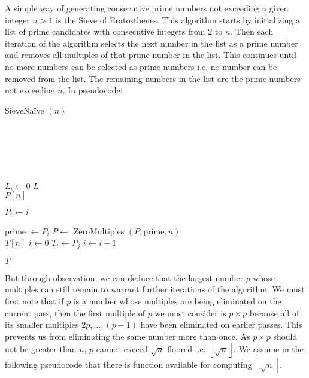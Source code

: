 \documentclass[12pt letter]{report}
\begin{document}
A simple way of generating consecutive prime numbers not exceeding a given integer $n > 1$ is the Sieve of Eratosthenes.
This algorithm starts by initializing a list of prime candidates with consecutive integers from $2 \text{ to } n$. Then
each iteration of the algorithm selects the next number in the list as a prime number and removes all multiples of that
prime number in the list. This continues until no more numbers can be selected as prime numbers i.e. no number can be
removed from the list. The remaining numbers in the list are the prime numbers not exceeding $n$. In pseudocode:

\begin{algorithm}[H]
  \caption{SieveNaïve $ \left( n \right) $}
  \Comment{}\\
   \\
   \\
   \\
  \begin{algorithmic}[1]
    \State $L_i \gets 0$
    \EndIf
    \EndFor
    \State \Return $L$
    \EndFunction\\

    \State $P[n]$ 

    \State $P_i \gets i $
    \EndFor

    \State prime $ \gets P_i$
    \State $P \gets$ ZeroMultiples $ \left( P, \text{prime}, n \right) $
    \EndIf
    \EndFor \\

    \State $T \left[ n \right] $ 
    \State $i \gets 0$
    \State $T_i \gets P_j$
    \State $i \gets i + 1$
    \EndIf
    \EndFor
    \State {}

    \State \Return $T$
  \end{algorithmic}
\end{algorithm}

But through observation, we can deduce that the largest number $p$ whose multiples can still remain to warrant further
iterations of the algorithm. We must first note that if $p$ is a number whose multiples are being eliminated on the
current pass, then the first multiple of $p$ we must consider is $p \times p$ because all of its smaller multiples $2p,
  \ldots, \left( p -1 \right) $ have been eliminated on earlier passes. This prevents us from eliminating the same number
more than once. As $p \times p$ should not be greater than $n$, $p$ cannot exceed $\sqrt{n}$ floored i.e. $\left\lfloor
  \sqrt{n}\right\rfloor$. We assume in the following pseudocode that there is function available for computing
$\left\lfloor \sqrt{n} \right\rfloor$.
\end{document}
